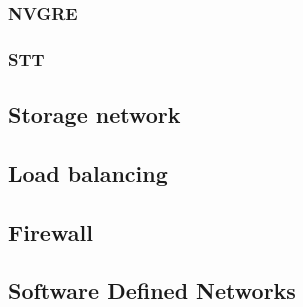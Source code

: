 \subsubsection{NVGRE}
\subsubsection{STT}

\subsection{Storage network}

\subsection{Load balancing}

\subsection{Firewall}

\subsection{Software Defined Networks}
